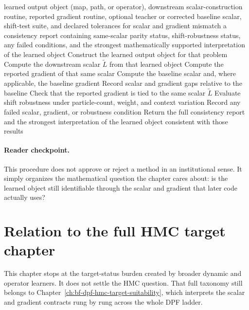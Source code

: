 \begin{algorithm}[ht]
\caption{\texttt{audit\_dynamic\_transport\_target\_contract}}
\begin{algorithmic}[1]
\Require learned output object (map, path, or operator), downstream scalar-construction routine, reported gradient routine, optional teacher or corrected baseline scalar, shift-test suite, and declared tolerances for scalar and gradient mismatch
\Ensure a consistency report containing same-scalar parity status, shift-robustness status, any failed conditions, and the strongest mathematically supported interpretation of the learned object
  \State Construct the learned output object for that problem
  \State Compute the downstream scalar \(\widetilde L\) from that learned object
  \State Compute the reported gradient of that same scalar
    \State Compute the baseline scalar and, where applicable, the baseline gradient
    \State Record scalar and gradient gaps relative to the baseline
  \EndIf
  \State Check that the reported gradient is tied to the same scalar \(\widetilde L\)
  \State Evaluate shift robustness under particle-count, weight, and context variation
  \State Record any failed scalar, gradient, or robustness condition
\EndFor
\State Return the full consistency report and the strongest interpretation of the learned object consistent with those results
\end{algorithmic}
\end{algorithm}

\paragraph{Reader checkpoint.}
This procedure does not approve or reject a method in an institutional sense.  It
simply organizes the mathematical question the chapter cares about: is the learned
object still identifiable through the scalar and gradient that later code actually
uses?

\section{Relation to the full HMC target chapter}
\label{sec:bf-neural-ot-dynamic-handoff}

This chapter stops at the target-status burden created by broader dynamic and
operator learners.  It does not settle the HMC question.  That full taxonomy still
belongs to Chapter~\ref{ch:bf-dpf-hmc-target-suitability}, which interprets the
scalar and gradient contracts rung by rung across the whole DPF ladder.

